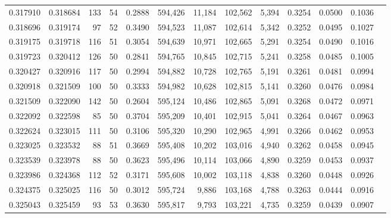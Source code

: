 \begin{tabular}{rrrrrrrrrrrrr}
0.317910 & 0.318684 &   133 &  54 &                                     0.2888 & 594,426 &  11,184 & 102,562 &   5,394 & 0.3254 & 0.0500 & 0.1036 \\
0.318696 & 0.319174 &    97 &  52 &                                     0.3490 & 594,523 &  11,087 & 102,614 &   5,342 & 0.3252 & 0.0495 & 0.1027 \\
0.319175 & 0.319718 &   116 &  51 &                                     0.3054 & 594,639 &  10,971 & 102,665 &   5,291 & 0.3254 & 0.0490 & 0.1016 \\
0.319723 & 0.320412 &   126 &  50 &                                     0.2841 & 594,765 &  10,845 & 102,715 &   5,241 & 0.3258 & 0.0485 & 0.1005 \\
0.320427 & 0.320916 &   117 &  50 &                                     0.2994 & 594,882 &  10,728 & 102,765 &   5,191 & 0.3261 & 0.0481 & 0.0994 \\
0.320918 & 0.321509 &   100 &  50 &                                     0.3333 & 594,982 &  10,628 & 102,815 &   5,141 & 0.3260 & 0.0476 & 0.0984 \\
0.321509 & 0.322090 &   142 &  50 &                                     0.2604 & 595,124 &  10,486 & 102,865 &   5,091 & 0.3268 & 0.0472 & 0.0971 \\
0.322092 & 0.322598 &    85 &  50 &                                     0.3704 & 595,209 &  10,401 & 102,915 &   5,041 & 0.3264 & 0.0467 & 0.0963 \\
0.322624 & 0.323015 &   111 &  50 &                                     0.3106 & 595,320 &  10,290 & 102,965 &   4,991 & 0.3266 & 0.0462 & 0.0953 \\
0.323025 & 0.323532 &    88 &  51 &                                     0.3669 & 595,408 &  10,202 & 103,016 &   4,940 & 0.3262 & 0.0458 & 0.0945 \\
0.323539 & 0.323978 &    88 &  50 &                                     0.3623 & 595,496 &  10,114 & 103,066 &   4,890 & 0.3259 & 0.0453 & 0.0937 \\
0.323986 & 0.324368 &   112 &  52 &                                     0.3171 & 595,608 &  10,002 & 103,118 &   4,838 & 0.3260 & 0.0448 & 0.0926 \\
0.324375 & 0.325025 &   116 &  50 &                                     0.3012 & 595,724 &   9,886 & 103,168 &   4,788 & 0.3263 & 0.0444 & 0.0916 \\
0.325043 & 0.325459 &    93 &  53 &                                     0.3630 & 595,817 &   9,793 & 103,221 &   4,735 & 0.3259 & 0.0439 & 0.0907 \\

\end{tabular}

